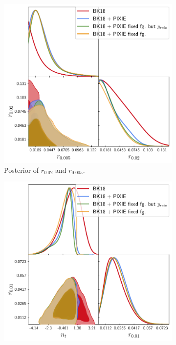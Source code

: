 \begin{figure}[ht]
        \centering
        \begin{subfigure}[b]{.49\textwidth}
            \centering
            \includegraphics[width=1\textwidth]{Constraints/BKPIXIE.pdf}
            \caption{Posterior of $r_{0.02}$ and $r_{0.005}$.}
            \label{fig:r_const} 
        \end{subfigure}
        \begin{subfigure}[b]{.49\textwidth}
            \centering
            \includegraphics[width=1\textwidth]{Constraints/nt.pdf}

\end{subfigure}
\end{figure}
